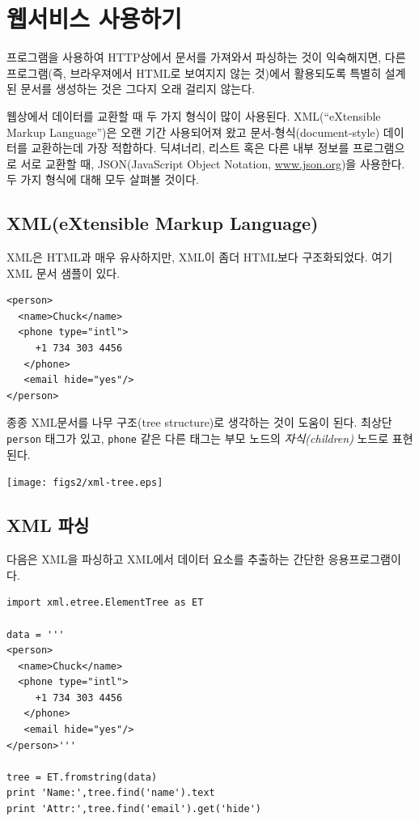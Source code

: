 
\chapter{웹서비스 사용하기}
프로그램을 사용하여 HTTP상에서 문서를 가져와서 파싱하는 것이 익숙해지면, 
다른 프로그램(즉, 브라우져에서 HTML로 보여지지 않는 것)에서 활용되도록 특별히 설계된 문서를 생성하는 것은 그다지 오래 걸리지 않는다.

웹상에서 데이터를 교환할 때 두 가지 형식이 많이 사용된다.
XML(``eXtensible Markup Language'')은 오랜 기간 사용되어져 왔고 문서-형식(document-style) 데이터를 교환하는데 가장 적합하다.
딕셔너리, 리스트 혹은 다른 내부 정보를 프로그램으로 서로 교환할 때, JSON(JavaScript Object Notation, \url{www.json.org})을 사용한다. 
두 가지 형식에 대해 모두 살펴볼 것이다.

\section{XML(eXtensible Markup Language)}
XML은 HTML과 매우 유사하지만, XML이 좀더 HTML보다 구조화되었다.
여기 XML 문서 샘플이 있다.

\beforeverb
\begin{verbatim}
<person>
  <name>Chuck</name>
  <phone type="intl">
     +1 734 303 4456
   </phone>
   <email hide="yes"/>
</person>
\end{verbatim}
\afterverb
%

종종 XML문서를 나무 구조(tree structure)로 생각하는 것이 도움이 된다. 
최상단 {\tt person} 태그가 있고, {\tt phone} 같은 다른 태그는 부모 노드의 \emph{자식(children)} 노드로 표현된다.

\beforefig
\centerline{\texttt{[image: figs2/xml-tree.eps]}}
\afterfig

\section{XML 파싱}


다음은 XML을 파싱하고 XML에서 데이터 요소를 추출하는 간단한 응용프로그램이다.

\beforeverb
\begin{verbatim}
import xml.etree.ElementTree as ET

data = '''
<person>
  <name>Chuck</name>
  <phone type="intl">
     +1 734 303 4456
   </phone>
   <email hide="yes"/>
</person>'''

tree = ET.fromstring(data)
print 'Name:',tree.find('name').text
print 'Attr:',tree.find('email').get('hide')
\end{verbatim}
\afterverb
%

